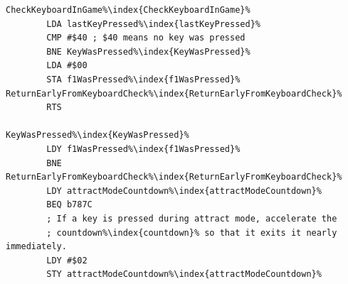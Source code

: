 \begin{lstlisting}[caption=Fixing the reappearing enemy bug,escapechar=\%]
CheckKeyboardInGame%\index{CheckKeyboardInGame}%
        LDA lastKeyPressed%\index{lastKeyPressed}%
        CMP #$40 ; $40 means no key was pressed
        BNE KeyWasPressed%\index{KeyWasPressed}%
        LDA #$00
        STA f1WasPressed%\index{f1WasPressed}%
ReturnEarlyFromKeyboardCheck%\index{ReturnEarlyFromKeyboardCheck}%   
        RTS

KeyWasPressed%\index{KeyWasPressed}%   
        LDY f1WasPressed%\index{f1WasPressed}%
        BNE ReturnEarlyFromKeyboardCheck%\index{ReturnEarlyFromKeyboardCheck}%
        LDY attractModeCountdown%\index{attractModeCountdown}%
        BEQ b787C
        ; If a key is pressed during attract mode, accelerate the
        ; countdown%\index{countdown}% so that it exits it nearly immediately.
        LDY #$02
        STY attractModeCountdown%\index{attractModeCountdown}%
\end{lstlisting}

